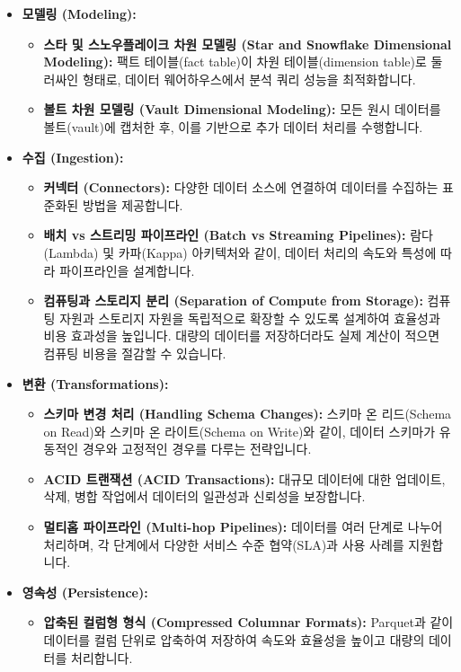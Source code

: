 \documentclass[11pt,a4paper]{article}
\begin{document}
\begin{itemize}
    \item \textbf{모델링 (Modeling):}
    \begin{itemize}
        \item \textbf{스타 및 스노우플레이크 차원 모델링 (Star and Snowflake Dimensional Modeling):} 팩트 테이블(fact table)이 차원 테이블(dimension table)로 둘러싸인 형태로, 데이터 웨어하우스에서 분석 쿼리 성능을 최적화합니다.
        \item \textbf{볼트 차원 모델링 (Vault Dimensional Modeling):} 모든 원시 데이터를 볼트(vault)에 캡처한 후, 이를 기반으로 추가 데이터 처리를 수행합니다.
    \end{itemize}
    \item \textbf{수집 (Ingestion):}
    \begin{itemize}
        \item \textbf{커넥터 (Connectors):} 다양한 데이터 소스에 연결하여 데이터를 수집하는 표준화된 방법을 제공합니다.
        \item \textbf{배치 vs 스트리밍 파이프라인 (Batch vs Streaming Pipelines):} 람다(Lambda) 및 카파(Kappa) 아키텍처와 같이, 데이터 처리의 속도와 특성에 따라 파이프라인을 설계합니다.
        \item \textbf{컴퓨팅과 스토리지 분리 (Separation of Compute from Storage):} 컴퓨팅 자원과 스토리지 자원을 독립적으로 확장할 수 있도록 설계하여 효율성과 비용 효과성을 높입니다. 대량의 데이터를 저장하더라도 실제 계산이 적으면 컴퓨팅 비용을 절감할 수 있습니다.
    \end{itemize}
    \item \textbf{변환 (Transformations):}
    \begin{itemize}
        \item \textbf{스키마 변경 처리 (Handling Schema Changes):} 스키마 온 리드(Schema on Read)와 스키마 온 라이트(Schema on Write)와 같이, 데이터 스키마가 유동적인 경우와 고정적인 경우를 다루는 전략입니다.
        \item \textbf{ACID 트랜잭션 (ACID Transactions):} 대규모 데이터에 대한 업데이트, 삭제, 병합 작업에서 데이터의 일관성과 신뢰성을 보장합니다.
        \item \textbf{멀티홉 파이프라인 (Multi-hop Pipelines):} 데이터를 여러 단계로 나누어 처리하며, 각 단계에서 다양한 서비스 수준 협약(SLA)과 사용 사례를 지원합니다.
    \end{itemize}
    \item \textbf{영속성 (Persistence):}
    \begin{itemize}
        \item \textbf{압축된 컬럼형 형식 (Compressed Columnar Formats):} Parquet과 같이 데이터를 컬럼 단위로 압축하여 저장하여 속도와 효율성을 높이고 대량의 데이터를 처리합니다.

\end{itemize}
\end{itemize}
\end{document}
